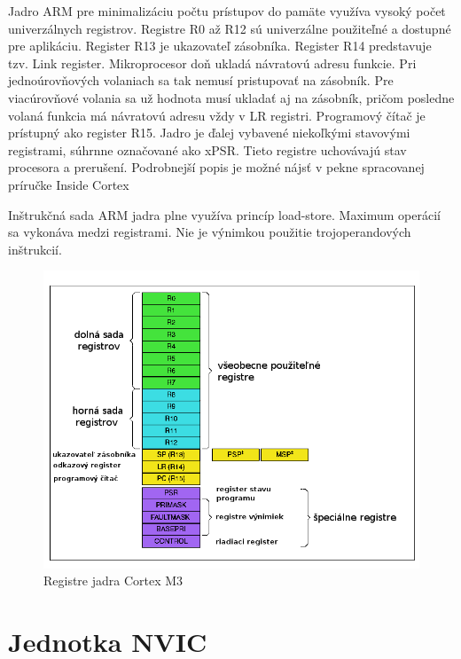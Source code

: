 Jadro ARM pre minimalizáciu počtu prístupov do pamäte využíva vysoký počet univerzálnych registrov. Registre R0 až R12 sú univerzálne použiteľné a dostupné pre aplikáciu. Register R13 je ukazovateľ zásobníka. Register R14 predstavuje tzv. Link register. Mikroprocesor doň ukladá návratovú adresu funkcie. Pri jednoúrovňových volaniach sa tak nemusí pristupovať na zásobník. Pre viacúrovňové volania sa už hodnota musí ukladať aj na zásobník, pričom posledne volaná funkcia má návratovú adresu vždy v LR registri. Programový čítač je prístupný ako register R15. Jadro je ďalej vybavené niekoľkými stavovými registrami, súhrnne označované ako xPSR. Tieto registre uchovávajú stav procesora a prerušení. Podrobnejší popis je možné nájsť v pekne spracovanej príručke Inside Cortex \cite{inside_cortex}

Inštrukčná sada ARM jadra plne využíva princíp load-store. Maximum operácií sa vykonáva medzi registrami. Nie je výnimkou použitie trojoperandových inštrukcií.  


\begin{figure}[ht]
\begin{center}
\begin{minipage}{1.1\linewidth}
\begin{center}
\includegraphics[width=.75\textwidth]{images/STM32F10xx_processor_core_registers.png}
\caption{Registre jadra Cortex M3 }
\label{obr2}
\end{center}
\end{minipage}
\end{center}
\end{figure}


\section{Jednotka NVIC}

